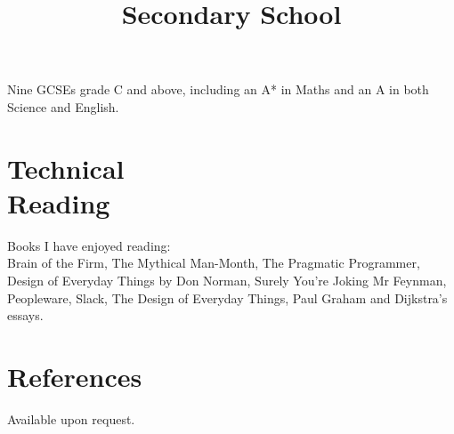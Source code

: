\documentclass[line,margin]{res}
\begin{document}
\begin{resume}
\begin{position}
\begin{comment}
\begin{tabular}{ l r r }
    Computing & A Level & B \\
    Maths & A Level & C \\
    Chemistry & A Level & D \\
    Physics & AS Level & D \\
    Critical Thinking & AS Level & E \\
\end{tabular}
\end{comment}
\end{position}

\title{Secondary School}
\begin{position}
Nine GCSEs grade C and above,
including an A* in Maths and an A in both Science and English.

\begin{comment}
\begin{tabular}{ l r r }
    Mathematics & (a year early) GCSE & A* \\
    Science & Double Award GCSE & AA \\
    English & GCSE & A \\
    History & GCSE & B \\
    Systems \& Control & GCSE & B \\
    ICT & Short Course GCSE & C \\
    Statistics & GCSE & C \\
    English Literature & GCSE & C \\
    Geography & GCSE & D \\
    Drama & GCSE & F \\
\end{tabular}
\end{comment}
\end{position}

\section{Technical \\ Reading}
Books I have enjoyed reading: \\
Brain of the Firm,
The Mythical Man-Month, %
The Pragmatic Programmer,
Design of Everyday Things by Don Norman,
Surely You're Joking Mr Feynman,
Peopleware, %
Slack,
The Design of Everyday Things,
Paul Graham and Dijkstra's essays.

\section{References}
Available upon request.

\end{resume}



\end{document}
